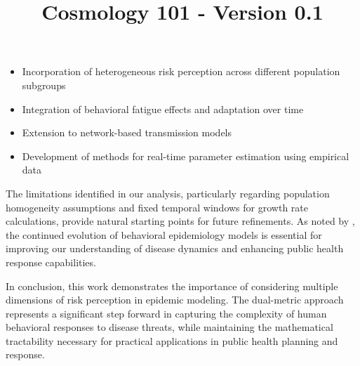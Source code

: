 \documentclass{article}\usepackage{graphicx} \usepackage{amsmath} \usepackage{colortbl}\title{Cosmology 101 - Version 0.1}
\begin{document}
\begin{itemize}
\item Incorporation of heterogeneous risk perception across different population subgroups
\item Integration of behavioral fatigue effects and adaptation over time
\item Extension to network-based transmission models
\item Development of methods for real-time parameter estimation using empirical data
\end{itemize}

The limitations identified in our analysis, particularly regarding population homogeneity assumptions and fixed temporal windows for growth rate calculations, provide natural starting points for future refinements. As noted by \cite{hethcote2000mathematics}, the continued evolution of behavioral epidemiology models is essential for improving our understanding of disease dynamics and enhancing public health response capabilities.

In conclusion, this work demonstrates the importance of considering multiple dimensions of risk perception in epidemic modeling. The dual-metric approach represents a significant step forward in capturing the complexity of human behavioral responses to disease threats, while maintaining the mathematical tractability necessary for practical applications in public health planning and response.
\end{document}
